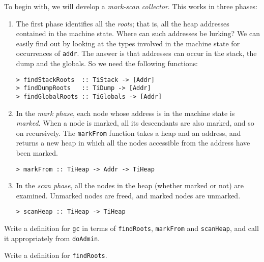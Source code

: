 To begin with, we will develop a {\em mark-scan collector}.
This works in three phases:
\begin{enumerate}
\item
The first phase identifies all the {\em roots\/}; that is,
all the heap addresses contained in the machine state.  Where can such addresses
be lurking?  We can easily find out by looking at the types involved in
the machine state for occurrences of \mbox{\tt addr}.  The answer is that addresses
can occur in the stack, the dump and the globals.  So we need the following
functions:
\begin{verbatim}
> findStackRoots  :: TiStack -> [Addr]
> findDumpRoots   :: TiDump -> [Addr]
> findGlobalRoots :: TiGlobals -> [Addr]
\end{verbatim}
%
%
%
\item
In the {\em mark phase}, each node whose address is in the machine
state is {\em marked}.  When a node is marked, all its descendants
are also marked, and so on recursively.
The \mbox{\tt markFrom} function takes a heap and an address, and returns a new
heap in which all the nodes accessible from the address have been marked.
\begin{verbatim}
> markFrom :: TiHeap -> Addr -> TiHeap
\end{verbatim}
%
\item
In the {\em scan phase}, all the nodes in the heap (whether marked or not)
are examined.  Unmarked nodes are freed, and marked nodes are unmarked.
\begin{verbatim}
> scanHeap :: TiHeap -> TiHeap
\end{verbatim}
%
\end{enumerate}
\begin{exercise}
Write a definition for \mbox{\tt gc} in terms of \mbox{\tt findRoots}, \mbox{\tt markFrom} and \mbox{\tt scanHeap},
and call it appropriately from \mbox{\tt doAdmin}.
\end{exercise}
\begin{exercise}
Write a definition for \mbox{\tt findRoots}.
\end{exercise}

